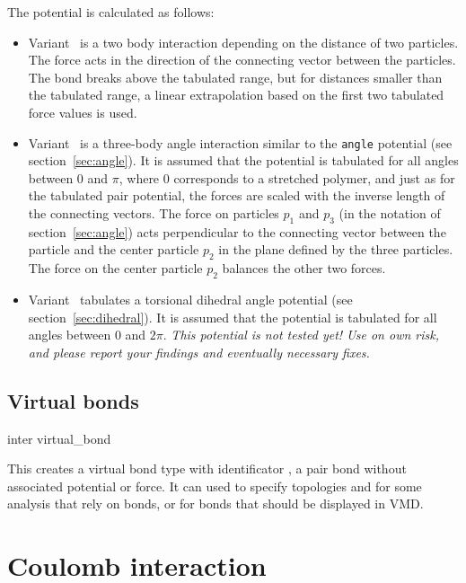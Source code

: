 The potential is calculated as follows:
\begin{itemize}
\item Variant~ is a two body interaction depending on the distance of
  two particles. The force acts in the direction of the connecting vector
  between the particles. The bond breaks above the tabulated range, but for
  distances smaller than the tabulated range, a linear extrapolation based on
  the first two tabulated force values is used.
\item Variant~ is a three-body angle interaction similar to the
  \texttt{angle} potential (see section~\ref{sec:angle}).  It is assumed that
  the potential is tabulated for all angles between 0 and $ \pi $, where 0
  corresponds to a stretched polymer, and just as for the tabulated pair
  potential, the forces are scaled with the inverse length of the connecting
  vectors. The force on particles $p_1$ and $p_3$ (in the notation of
  section~\ref{sec:angle}) acts perpendicular to the connecting vector between
  the particle and the center particle $p_2$ in the plane defined by the three
  particles. The force on the center particle $p_2$ balances the other two
  forces.
\item Variant~ tabulates a torsional dihedral angle potential (see
  section~\ref{sec:dihedral}). It is assumed that the potential is tabulated for
  all angles between 0 and $2\pi$. \em{This potential is not tested yet! Use on
    own risk, and please report your findings and eventually necessary fixes.}
\end{itemize}

\subsection{Virtual bonds}

\begin{essyntax}
  inter  virtual_bond
\end{essyntax}

This creates a virtual bond type with identificator , \ie
a pair bond without associated potential or force. It can used to specify
topologies and for some analysis that rely on bonds, or \eg for bonds that
should be displayed in VMD.

\section{Coulomb interaction}
\label{sec:inter-electrostatics}

